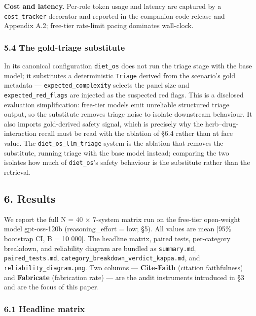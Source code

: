 \documentclass[
]{article}
\begin{document}
\textbf{Cost and latency.} Per-role token usage and latency are captured
by a \texttt{cost\_tracker} decorator and reported in the companion code
release and Appendix A.2; free-tier rate-limit pacing dominates
wall-clock.

\hypertarget{the-gold-triage-substitute}{%
\subsubsection{5.4 The gold-triage
substitute}\label{the-gold-triage-substitute}}

In its canonical configuration \texttt{diet\_os} does not run the triage
stage with the base model; it substitutes a deterministic
\texttt{Triage} derived from the scenario's gold metadata ---
\texttt{expected\_complexity} selects the panel size and
\texttt{expected\_red\_flags} are injected as the suspected red flags.
This is a disclosed evaluation simplification: free-tier models emit
unreliable structured triage output, so the substitute removes triage
noise to isolate downstream behaviour. It also imports gold-derived
safety signal, which is precisely why the herb--drug-interaction recall
must be read with the ablation of §6.4 rather than at face value. The
\texttt{diet\_os\_llm\_triage} system is the ablation that removes the
substitute, running triage with the base model instead; comparing the
two isolates how much of \texttt{diet\_os}'s safety behaviour is the
substitute rather than the retrieval.

\hypertarget{results}{%
\subsection{6. Results}\label{results}}

We report the full N = 40 × 7-system matrix run on the free-tier
open-weight model gpt-oss-120b (reasoning\_effort = low; §5). All values
are mean {[}95\% bootstrap CI, B = 10 000{]}. The headline matrix,
paired tests, per-category breakdown, and reliability diagram are
bundled as \texttt{summary.md}, \texttt{paired\_tests.md},
\texttt{category\_breakdown\_verdict\_kappa.md}, and
\texttt{reliability\_diagram.png}. Two columns --- \textbf{Cite-Faith}
(citation faithfulness) and \textbf{Fabricate} (fabrication rate) ---
are the audit instruments introduced in §3 and are the focus of this
paper.

\hypertarget{headline-matrix}{%
\subsubsection{6.1 Headline matrix}\label{headline-matrix}}
\end{document}
